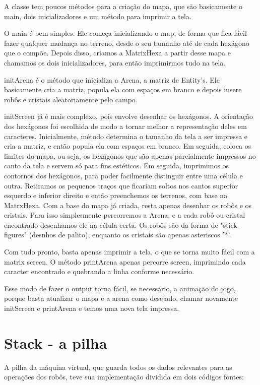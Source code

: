 \documentclass[a4paper]{article}
\begin{document}
    A classe tem poucos métodos para a criação do mapa, que são basicamente o main, dois inicializadores e um método para imprimir a tela.
    
    O main é bem simples. Ele começa inicializando o map, de forma que fica fácil fazer qualquer mudança no terreno, desde o seu tamanho até de cada hexágono que o compõe. Depois disso, criamos a MatrixHexa a partir desse mapa e chamamos os dois inicializadores, para então imprimirmos tudo na tela.
    
    initArena é o método que inicializa a Arena, a matriz de Entity's. Ele basicamente cria a matriz, popula ela com espaços em branco e depois insere robôs e cristais aleatoriamente pelo campo.
    
    initScreen já é mais complexo, pois envolve desenhar os hexágonos. A orientação dos hexágonos foi escolhida de modo a tornar melhor a representação deles em caracteres. Inicialmente, método determina o tamanho da tela a ser impressa e cria a matriz, e então popula ela com espaços em branco. Em seguida, coloca os limites do mapa, ou seja, os hexágonos que são apenas parcialmente impressos no canto da tela e servem só para fins estéticos.
    Em seguida, imprimimos os contornos dos hexágonos, para poder facilmente distinguir entre uma célula e outra. Retiramos os pequenos traços que ficariam soltos nos cantos superior esquerdo e inferior direito e então preenchemos os terrenos, com base na MatrxHexa.
    Com a base do mapa já criada, resta apenas desenhar os robôs e os cristais. Para isso simplesmente percorremos a Arena, e a cada robô ou cristal encontrado desenhamos ele na célula certa. Os robôs são da forma de "stick-figures" (desnhos de palito), enquanto os cristais são apenas asteriscos '*'.
        
    Com tudo pronto, basta apenas imprimir a tela, o que se torna muito fácil com a matrix screen. O método printArena apenas percorre screen, imprimindo cada caracter encontrado e quebrando a linha conforme necessário.
    
    Esse modo de fazer o output torna fácil, se necessário, a animação do jogo, porque basta atualizar o mapa e a arena como desejado, chamar novamente initScreen e printArena e temos uma nova tela impressa.
    
\newpage
\section{Stack - a pilha}
A pilha da máquina virtual, que guarda todos os dados relevantes para as operações dos robôs, teve sua implementação dividida em dois códigos fontes:
\end{document}
